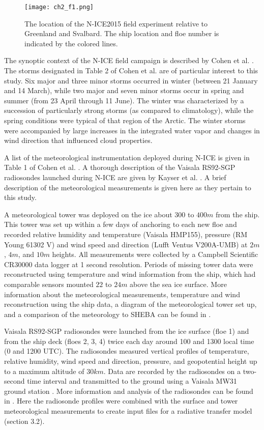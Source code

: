 \begin{figure}[H]
    \centering
    \texttt{[image: ch2\_f1.png]}
    \caption[N-ICE2015 experiment location.]{The location of the N-ICE2015 field experiment relative to Greenland and Svalbard. The ship location and floe number is indicated by the colored lines.}
    \label{fig:ch2_f1}
\end{figure}

The synoptic context of the N-ICE field campaign is described by Cohen et al. \cite{cohen:2017}. The storms designated in Table 2 of Cohen et al. \cite{cohen:2017} are of particular interest to this study. Six major and three minor storms occurred in winter (between 21 January and 14 March), while two major and seven minor storms occur in spring and summer (from 23 April through 11 June). The winter was characterized by a succession of particularly strong storms (as compared to climatology), while the spring conditions were typical of that region of the Arctic. The winter storms were accompanied by large increases in the integrated water vapor and changes in wind direction \cite{kayser:2017} that influenced cloud properties.  

A list of the meteorological instrumentation deployed during N-ICE is given in Table 1 of Cohen et al. \cite{cohen:2017}. A thorough description of the Vaisala RS92-SGP radiosondes launched during N-ICE are given by Kayser et al. \cite{kayser:2017}. A brief description of the meteorological measurements is given here as they pertain to this study.

A meteorological tower was deployed on the ice about $300$ to $400 m$ from the ship. This tower was set up within a few days of anchoring to each new floe and recorded relative humidity and temperature (Vaisala HMP155), pressure (RM Young 61302 V) and wind speed and direction (Lufft Ventus V200A-UMB) at $2 m$, $4 m$, and $10 m$ heights. All measurements were collected by a Campbell Scientific CR30000 data logger at 1 second resolution. Periods of missing tower data were reconstructed using temperature and wind information from the ship, which had comparable sensors mounted $22$ to $24 m$ above the sea ice surface. More information about the meteorological measurements, temperature and wind reconstruction using the ship data, a diagram of the meteorological tower set up, and a comparison of the meteorology to SHEBA can be found in \cite{cohen:2017}. 

Vaisala RS92-SGP radiosondes were launched from the ice surface (floe 1) and from the ship deck (floes 2, 3, 4) twice each day around  100 and 1300 local time (0 and 1200 UTC). The radiosondes measured vertical profiles of temperature, relative humidity, wind speed and direction, pressure, and geopotential height up to a maximum altitude of $30 km$. Data are recorded by the radiosondes on a two-second time interval and transmitted to the ground using a Vaisala MW31 ground station \cite{kayser:2017, cohen:2017}. More information and analysis of the radiosondes can be found in \cite{kayser:2017}. Here the radiosonde profiles were combined with the surface and tower meteorological measurements to create input files for a radiative transfer model (section 3.2).

